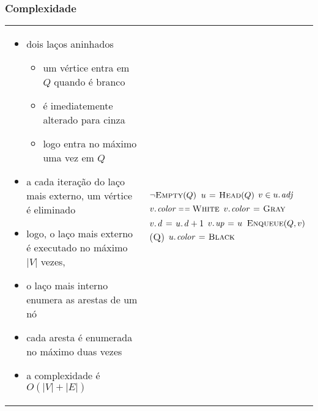\documentclass{beamer}
\begin{document}
\begin{frame}
\frametitle{Complexidade}

\hspace*{-1cm}
\begin{tabular}{ll}
\begin{minipage}{.6\textwidth}
\begin{itemize}
\item dois laços aninhados
\begin{itemize}
\item um vértice entra em $Q$ quando é branco
\item é imediatemente alterado para cinza
\item logo entra no máximo uma vez em $Q$
\end{itemize}
\item a cada iteração do laço mais externo, um vértice é eliminado
\item logo, o laço mais externo é executado no máximo $|V|$ vezes,
\item o laço mais interno enumera as arestas de um nó
\item cada aresta é enumerada no máximo duas vezes
\item a complexidade é $O(|V|+|E|)$
\end{itemize}
\end{minipage}
&
\begin{minipage}{.35\textwidth}
\small
\begin{codebox}
\zi \Comment{Processamento}
\zi \While $\neg \textnormal{\scshape Empty}(Q)$
\zi \Do $u \mathrel{\hspace{1pt}=\hspace{1pt}} \textnormal{\scshape Head}(Q)$
\zi   \For $v \in \attrib{u}{adj}$
\zi   \Do \If $\attrib{v}{color} \isequal \const{White}$
\zi     \Then $\attrib{v}{color} \gets \const{Gray}$
\zi       $\attrib{v}{d} \gets \attrib{u}{d}+1$
\zi       $\attrib{v}{up} \gets u$
\zi       $\textnormal{\scshape Enqueue}(Q, v)$
     \End
   \End
\zi   \proc{Dequeue}(Q)
\zi   $\attrib{u}{color} \gets \const{Black}$
\zi \End
\end{codebox}
\end{minipage}
\end{tabular}
\end{frame}
\end{document}
